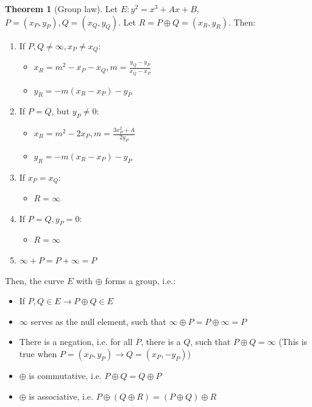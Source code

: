 \documentclass[11pt]{article}
\theoremstyle{definition}
\newtheorem{theorem}{Theorem}[section]
\theoremstyle{proof}
\begin{document}
\begin{theorem}[Group law]
	Let $E: y^2 = x^3 + Ax + B$, $P = (x_P, y_P), Q = (x_Q, y_Q)$. Let $R = P \oplus Q = (x_R, y_R)$. Then:
	
	\begin{enumerate}
		\item If $P, Q \ne \infty, x_P \ne x_Q$:
		\begin{itemize}
			\item $x_R = m^2 - x_P - x_Q, m = \frac{y_Q - y_P}{x_Q - x_P}$
			\item $y_R = -m (x_R - x_P) - y_P$
		\end{itemize}
		\item If $P = Q$, but $y_P \ne 0$:
		\begin{itemize}
			\item $x_R = m^2 - 2x_P, m = \frac{3x_P^2 + A}{2y_P}$
			\item $y_R = -m(x_R - x_P) - y_P$
		\end{itemize}
		\item If $x_P = x_Q$:
		\begin{itemize}
			\item $R = \infty$
		\end{itemize}
		\item If $P = Q, y_P = 0$:
		\begin{itemize}
			\item $R = \infty$
		\end{itemize}
		\item $\infty + P = P + \infty = P$
	\end{enumerate}
	
	Then, the curve $E$ with $\oplus$ forms a group, i.e.:
	
	\begin{itemize}
		\item If $P, Q \in E \rightarrow P \oplus Q \in E$
		\item $\infty$ serves as the null element, such that $\infty \oplus P = P \oplus \infty = P$
		\item There is a negation, i.e. for all $P$, there is a $Q$, such that $P \oplus Q = \infty$ (This is true when $P = (x_P, y_P) \rightarrow Q = (x_P, -y_P)$)
		\item $\oplus$ is commutative, i.e. $P \oplus Q = Q \oplus P$
		\item $\oplus$ is associative, i.e. $P \oplus (Q \oplus R) = (P \oplus Q) \oplus R$
	\end{itemize}
\end{theorem}
\end{document}
